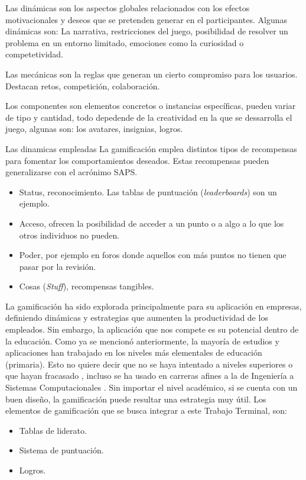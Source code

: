 \documentclass{article}
\begin{document}
Las dinámicas son los aspectos globales relacionados con los efectos motivacionales y deseos que se pretenden generar en el participantes. Algunas dinámicas son: La narrativa, restricciones del juego, posibilidad de resolver un problema en un entorno limitado, emociones como la curiosidad o competetividad.

Las mecánicas son la reglas que generan un cierto compromiso para los usuarios. Destacan retos, competición, colaboración.

Los componentes son elementos concretos o instancias específicas, pueden variar de tipo y cantidad, todo depedende de la creatividad en la que se dessarrolla el juego, algunas son: los avatares, insignias, logros.

Las dinamicas empleadas 
La gamificación emplea distintos tipos de recompensas para fomentar los comportamientos deseados. Estas recompensas pueden generalizarse con el acrónimo SAPS.
\begin{itemize}
	\item Status, reconocimiento. Las tablas de puntuación (\emph{leaderboards}) son un ejemplo.
	\item Acceso, ofrecen la posibilidad de acceder a un punto o a algo a lo que los otros individuos no pueden.
	\item Poder, por ejemplo en foros donde aquellos con más puntos no tienen que pasar por la revisión.
	\item Cosas (\emph{Stuff}), recompensas tangibles. 
\end{itemize}

La gamificación ha sido explorada principalmente para su aplicación en empresas, definiendo dinámicas y estrategias que aumenten la productividad de los empleados. Sin embargo, la aplicación que nos compete es su potencial dentro de la educación. Como ya se mencionó anteriormente, la mayoría de estudios y aplicaciones han trabajado en los niveles más elementales de educación (primaria)\cite{rodrigues2017math}. Esto no quiere decir que no se haya intentado a niveles superiores o que hayan fracasado \cite{wiggins2016overview,sanchez2017classcraft,tan2018}, incluso se ha usado
en carreras afines a la de Ingeniería a Sistemas Computacionales \cite{ibanez2014gamification}. Sin importar el nivel académico, si
se cuenta con un buen diseño, la gamificación puede resultar una estrategia muy útil. Los elementos de
gamificación que se busca integrar a este Trabajo Terminal, son:

\begin{itemize}
\item{Tablas de liderato.}
\item{Sistema de puntuación.}
\item{Logros.}
\end{itemize}
\end{document}
